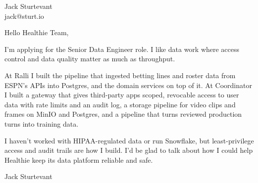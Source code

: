 \documentclass[11pt]{article}
\begin{document}
\raggedright

{\namefont\fontsize{20pt}{24pt}\selectfont Jack Sturtevant}\\[-0.3em]
jack@sturt.io

\vspace{1.2em}

Hello Healthie Team,

I'm applying for the Senior Data Engineer role. I like data work where access control and data quality matter as much as throughput.

At Ralli I built the pipeline that ingested betting lines and roster data from ESPN's APIs into Postgres, and the domain services on top of it. At Coordinator I built a gateway that gives third-party apps scoped, revocable access to user data with rate limits and an audit log, a storage pipeline for video clips and frames on MinIO and Postgres, and a pipeline that turns reviewed production turns into training data.

I haven't worked with HIPAA-regulated data or run Snowflake, but least-privilege access and audit trails are how I build. I'd be glad to talk about how I could help Healthie keep its data platform reliable and safe.

\vspace{0.6em}
Jack Sturtevant
\end{document}
